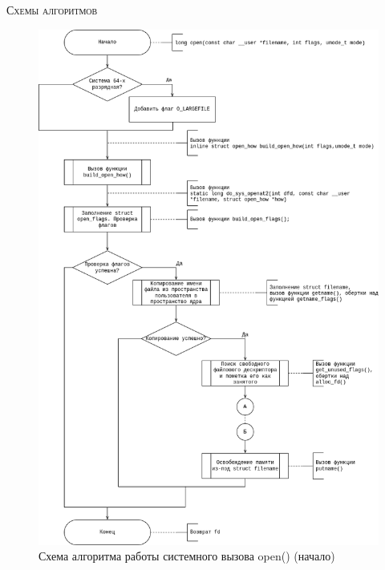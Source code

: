 \textsc{\huge Схемы алгоритмов} \\
\begin{figure}[H]
	\centering
	\includegraphics[scale=0.5]{assets/flowchart-open.drawio.png}
	\caption{Схема алгоритма работы системного вызова open() (начало)}
\end{figure}

